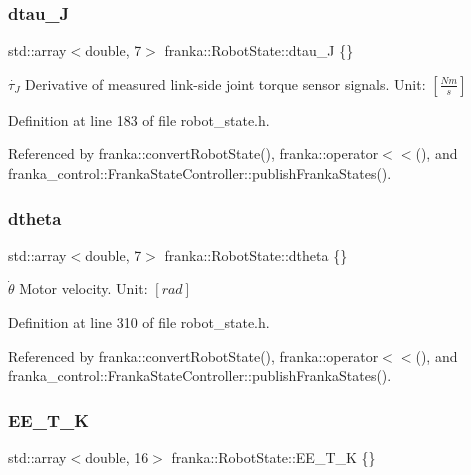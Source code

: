 \mbox{\label{structfranka_1_1RobotState_ae6b0d4ee0d7b36240a2165e6ded6f4b9}} 
\subsubsection{\texorpdfstring{dtau\+\_\+J}{dtau\_J}}
{\footnotesize\ttfamily std\+::array$<$double, 7$>$ franka\+::\+Robot\+State\+::dtau\+\_\+J \{\}}

$\dot{\tau_{J}}$ Derivative of measured link-\/side joint torque sensor signals. Unit\+: $[\frac{Nm}{s}]$ 

Definition at line 183 of file robot\+\_\+state.\+h.



Referenced by franka\+::convert\+Robot\+State(), franka\+::operator$<$$<$(), and franka\+\_\+control\+::\+Franka\+State\+Controller\+::publish\+Franka\+States().

\mbox{\label{structfranka_1_1RobotState_a271db0a55dd346715ed8a0daf3f8887c}} 
\subsubsection{\texorpdfstring{dtheta}{dtheta}}
{\footnotesize\ttfamily std\+::array$<$double, 7$>$ franka\+::\+Robot\+State\+::dtheta \{\}}

$\dot{\theta}$ Motor velocity. Unit\+: $[rad]$ 

Definition at line 310 of file robot\+\_\+state.\+h.



Referenced by franka\+::convert\+Robot\+State(), franka\+::operator$<$$<$(), and franka\+\_\+control\+::\+Franka\+State\+Controller\+::publish\+Franka\+States().

\mbox{\label{structfranka_1_1RobotState_aeb78a3b4b76d4f57b9898cbea3a0f7aa}} 
\subsubsection{\texorpdfstring{E\+E\+\_\+\+T\+\_\+K}{EE\_T\_K}}
{\footnotesize\ttfamily std\+::array$<$double, 16$>$ franka\+::\+Robot\+State\+::\+E\+E\+\_\+\+T\+\_\+K \{\}}

